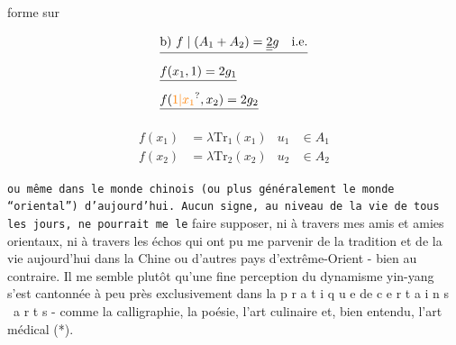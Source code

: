  forme sur


\[
\begin{aligned}
 &\deleted{\text{b) } f\mid(A_1+A_2)=\underline{\underline{2}}g\quad\text{i.e.}}\\
 &\deleted{f(x_1,1)=2g_1}\\
 &\deleted{f(\unsure{1|x_1},x_2)=2g_2}
\end{aligned}
\]

\[
\begin{aligned}
f(x_1)&=\lambda\mathrm{Tr}_1(x_1) &u_1&\in A_1\\
f(x_2)&=\lambda\mathrm{Tr}_2(x_2) &u_2&\in A_2
\end{aligned}
\]



\texttt{ou même dans le monde chinois (ou plus généralement le monde ``oriental'') d'aujourd'hui. Aucun signe, au niveau de la vie de tous les jours, ne pourrait me le} faire supposer, ni à travers mes amis et amies orientaux, ni à travers les échos qui ont pu me parvenir de la tradition et de la vie  aujourd'hui dans la Chine ou d'autres pays d'extrême-Orient - bien au contraire. Il me semble plutôt qu'une fine perception du dynamisme yin-yang s'est cantonnée à peu près exclusivement dans la p r a t i q u e de c e r t a i n s \ a r t s - comme la calligraphie, la poésie, l'art culinaire et, bien entendu, l'art médical (*).

